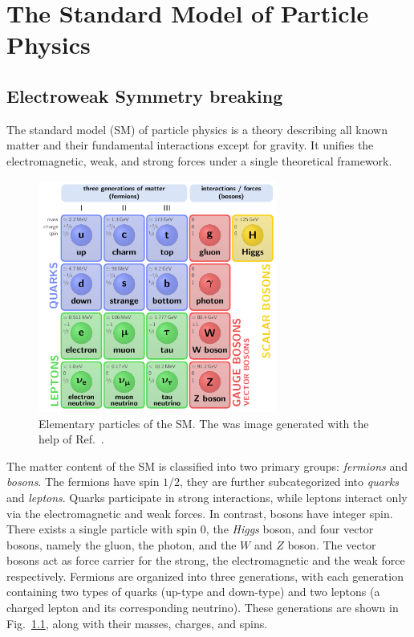 
\chapter{The Standard Model of Particle Physics}\label{chap:two}

\section{Electroweak Symmetry breaking}
The standard model (\acs{SM}) of particle physics is a theory describing all known matter and their fundamental interactions except for gravity. It unifies the electromagnetic, weak, and strong forces under a single theoretical framework.
\begin{figure}
\centering
\includegraphics[width=0.7\textwidth]{Images/SM.pdf}
\caption{Elementary particles of the \acs{SM}. The was image generated with the help of Ref.~\cite{Neutelings_2024}.}
\label{fig:2:SM}
\end{figure}
The matter content of the \acs{SM} is classified into two primary groups: \textit{fermions} and \textit{bosons}. The fermions have spin $1/2$, they are further subcategorized into \textit{quarks} and \textit{leptons}. Quarks participate in strong interactions, while leptons interact only via the electromagnetic and weak forces. In contrast, bosons have integer spin. There exists a single particle with spin 0, the \textit{Higgs} boson, and four vector bosons, namely the gluon, the photon, and the $W$ and $Z$ boson. The vector bosons act as force carrier for the strong, the electromagnetic and the weak force respectively. Fermions are organized into three generations, with each generation containing two types of quarks (up-type and down-type) and two leptons (a charged lepton and its corresponding neutrino). These generations are shown in Fig.~\ref{fig:2:SM}, along with their masses, charges, and spins.

